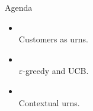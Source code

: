\begin{frame}{Agenda}
  \medskip
  \begin{itemize}
    \setlength{\itemsep}{1.0em}
    \item[\textbf{\textcolor{clusterLF}{1.}}]
           \\[1pt]
          {\scriptsize\color{mutedWarmGray}Customers as urns.}
    \item[\textbf{\textcolor{clusterDF}{2.}}]
           \\[1pt]
          {\scriptsize\color{mutedWarmGray}$\varepsilon$-greedy and UCB.}
    \item[\textbf{\textcolor{clusterDN}{3.}}]
           \\[1pt]
          {\scriptsize\color{mutedWarmGray}Contextual urns.}
  \end{itemize}
\end{frame}

%

